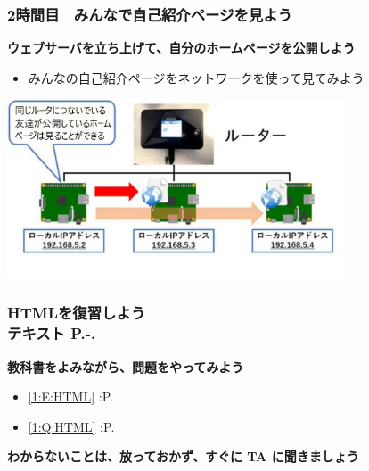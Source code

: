 

\begin{frame}[fragile]
	\frametitle{2時間目　みんなで自己紹介ページを見よう ~~~}
    \textbf{ウェブサーバを立ち上げて、自分のホームページを公開しよう}
        \begin{itemize}\small
            \item みんなの自己紹介ページをネットワークを使って見てみよう
        \end{itemize}
        \begin{minipage}{\textwidth}
            {\upshape
              \includegraphics[width=100mm]{./slide07-img/slide07-img015.png}}
        \end{minipage}
\end{frame}

\begin{frame}[fragile]
	\frametitle{HTMLを復習しよう\\テキスト P.\pageref{1:P:HTML}-.\pageref{1:P:HP}~~~}
      \large\textbf{教科書をよみながら、問題をやってみよう}
				\begin{itemize}\small
					\item \ref*{1:E:HTML} :P.\pageref{1:E:HTML}
					\item \ref*{1:Q:HTML} :P.\pageref{1:Q:HTML}
				\end{itemize}
      \vfill
      \large\textbf{わからないことは、放っておかず、すぐに TA に聞きましょう}
\end{frame}

